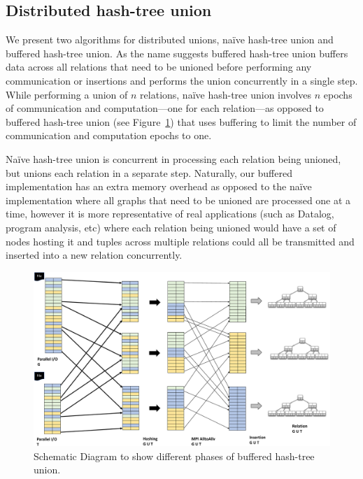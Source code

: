 \subsection{Distributed hash-tree union}


We present two algorithms for distributed unions, na\"ive hash-tree union and buffered hash-tree union. As the name suggests buffered hash-tree union buffers data across all relations that need to be unioned before performing any communication or insertions and performs the union concurrently in a single step. While performing a union of $n$ relations, na\"ive hash-tree union involves $n$ epochs of communication and computation---one for each relation---as opposed to buffered hash-tree union (see Figure~\ref{fig:union_2}) that uses buffering to limit the number of communication and computation epochs to one.

Na\"ive hash-tree union is concurrent in processing each relation being unioned, but unions each relation in a separate step. Naturally, our buffered implementation has an extra memory overhead as opposed to the na\"ive implementation where all graphs that need to be unioned are processed one at a time, however it is more representative of real applications (such as Datalog, program analysis, etc) where each relation being unioned would have a set of nodes hosting it and tuples across multiple relations could all be transmitted and inserted into a new relation concurrently.

\begin{figure}[h]
	\includegraphics[width=\columnwidth]{results/union_2.pdf}
	\caption{Schematic Diagram to show different phases of buffered hash-tree union.}
	\label{fig:union_2}
\end{figure}


